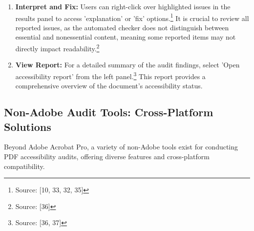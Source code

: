 \begin{enumerate}[noitemsep,topsep=0pt]
\begin{itemize}[noitemsep,topsep=0pt]
        \item \textbf{Needs Manual Check:} Signifies that the item could not be automatically verified and requires manual inspection.\footnote{Source: [3, 36, 37]}
        \item \textbf{Failed:} Denotes that the item did not pass the accessibility check.\footnote{Source: [3, 36, 37]}
    \end{itemize}
    \item \textbf{Interpret and Fix:} Users can right-click over highlighted issues in the results panel to access 'explanation' or 'fix' options.\footnote{Source: [10, 33, 32, 35]} It is crucial to review all reported issues, as the automated checker does not distinguish between essential and nonessential content, meaning some reported items may not directly impact readability.\footnote{Source: [36]}
    \item \textbf{View Report:} For a detailed summary of the audit findings, select 'Open accessibility report' from the left panel.\footnote{Source: [36, 37]} This report provides a comprehensive overview of the document's accessibility status.
\end{enumerate}

\subsection{Non-Adobe Audit Tools: Cross-Platform Solutions}

Beyond Adobe Acrobat Pro, a variety of non-Adobe tools exist for conducting PDF accessibility audits, offering diverse features and cross-platform compatibility.

